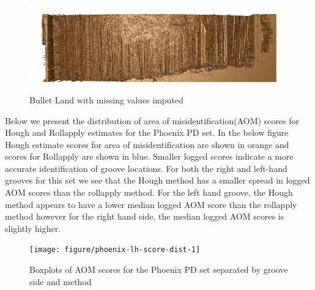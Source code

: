 \documentclass[12pt]{article}\usepackage[]{graphicx}\usepackage[]{color}
\makeatletter
\def\maxwidth{ %
  \ifdim\Gin@nat@width>\linewidth
    \linewidth
  \else
    \Gin@nat@width
  \fi
}
\newenvironment{knitrout}{}{} %
\theoremstyle{nonumberplain}
\makeatother
\begin{document}
\begin{knitrout}
\color{fgcolor}\begin{figure}[H]

{\centering \includegraphics[width=\maxwidth]{../images/fill-na-example} 

}

\caption[Bullet Land with missing values imputed]{Bullet Land with missing values imputed}\label{fig:five-percent-imputed}
\end{figure}


\end{knitrout}
 
 
Below we present the distribution of area of misidentification(AOM) scores for Hough and Rollapply estimates for the Phoenix PD set. In the below figure Hough estimate scores for area of misidentification are shown in orange and scores for Rollapply are shown in blue. Smaller logged scores indicate a more accurate identification of groove locations. For both the right and left-hand grooves for this set we see that the Hough method has a smaller spread in logged AOM scores than the rollapply method. For the left hand groove, the Hough method appears to have a lower median logged AOM score than the rollapply method however for the right hand side, the median logged AOM scores is slightly higher. 

\begin{knitrout}
\color{fgcolor}\begin{figure}[H]

{\centering \texttt{[image: figure/phoenix-lh-score-dist-1]} 

}

\caption[Boxplots of AOM scores for the Phoenix PD set separated by groove side and method]{Boxplots of AOM scores for the Phoenix PD set separated by groove side and method}\label{fig:phoenix-lh-score-dist}
\end{figure}


\end{knitrout}
\end{document}
